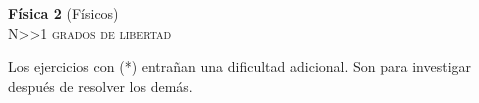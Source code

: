 \documentclass[11pt,spanish,a4paper]{article}
\begin{document}
\begin{center}
\textbf{Física 2} (Físicos) \hfill {}\\
	\textsc{\LARGE N\textgreater\textgreater1 grados de libertad}
\end{center}

Los ejercicios con (*) entrañan una dificultad adicional. Son para investigar después de resolver los demás.


\begin{enumerate}



\end{enumerate}
\end{document}
